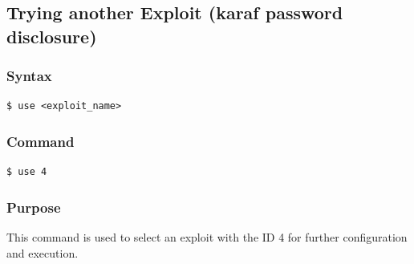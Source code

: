 \documentclass[11pt]{article}
\begin{document}
\subsection{Trying another Exploit (karaf password disclosure)}

\subsubsection*{Syntax}
\begin{verbatim}
$ use <exploit_name>
\end{verbatim}

\subsubsection*{Command}
\begin{verbatim}
$ use 4
\end{verbatim}

\subsubsection*{Purpose}
This command is used to select an exploit with the ID 4 for further configuration and execution.
\end{document}
